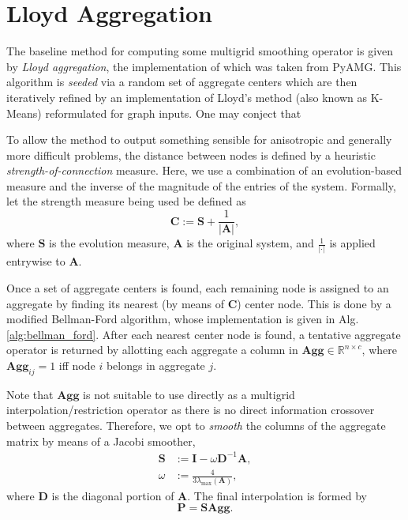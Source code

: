 \documentclass{article}
\newcommand{\abs}[1]{\left\lvert#1\right\rvert}
\newcommand{\mat}[1]{\bm{{#1}}}
\begin{document}
\section{Lloyd Aggregation}
The baseline method for computing some multigrid smoothing operator is given by \textit{Lloyd aggregation}, the implementation of which was taken from PyAMG\cite{OlSc2018}.  This algorithm is \textit{seeded} via a random set of aggregate centers which are then iteratively refined by an implementation of Lloyd's method (also known as K-Means) reformulated for graph inputs\cite{bell_2008}.  One may conject that

To allow the method to output something sensible for anisotropic and generally more difficult problems, the distance between nodes is defined by a heuristic \textit{strength-of-connection} measure.  Here, we use a combination of an evolution-based measure\cite{Olson2009} and the inverse of the magnitude of the entries of the system.  Formally, let the strength measure being used be defined as
\begin{equation}
  \mat{C} := \mat{S} + \frac{1}{\abs{\mat{A}}},
\end{equation}
where $\mat{S}$ is the evolution measure, $\mat{A}$ is the original system, and $\frac{1}{\abs{\cdot}}$ is applied entrywise to $\mat{A}$.

Once a set of aggregate centers is found, each remaining node is assigned to an aggregate by finding its nearest (by means of $\mat{C}$) center node.  This is done by a modified Bellman-Ford algorithm\cite{bell_2008}, whose implementation is given in Alg. \ref{alg:bellman_ford}.  After each nearest center node is found, a tentative aggregate operator is returned by allotting each aggregate a column in $\mat{\text{Agg}}\in\mathbb{R}^{n \times c}$, where $\mat{\text{Agg}}_{ij}=1$ iff node $i$ belongs in aggregate $j$.

Note that $\mat{\text{Agg}}$ is not suitable to use directly as a multigrid interpolation/restriction operator as there is no direct information crossover between aggregates.  Therefore, we opt to \textit{smooth} the columns of the aggregate matrix by means of a Jacobi smoother,
\begin{align}
  \mat{S} &:= \mat{I} - \omega\mat{D}^{-1}\mat{A}, \\
  \omega &:= \frac{4}{3\lambda_{\max}\left(\mat{A}\right)},
\end{align}
where $\mat{D}$ is the diagonal portion of $\mat{A}$.  The final interpolation is formed by
\begin{equation}
  \mat{P} = \mat{S} \mat{\text{Agg}}.
\end{equation}
\end{document}
